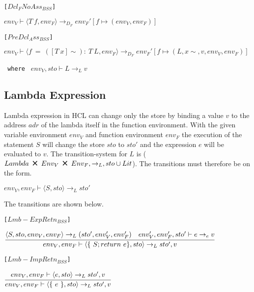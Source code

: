 \texttt{[$Dcl_FNoAss_{BSS}$]}
\begin{center}
	\begin{math}
	{env_V \vdash \langle T\ f,env_F \rangle \rightarrow_{D_F} env_F'[f \mapsto (env_V, env_F)]}
	\end{math}
\end{center}

\texttt{[$PreDcl_Ass_{BSS}$]}
\begin{center}
	\begin{math}
	{env_V \vdash \langle f\ =\ ([T\ x]\sim):\ T\ L,env_F \rangle \rightarrow_{D_F} env_F'[f \mapsto (L, x\sim, v, env_V, env_F)]}
	\end{math}
	
	\texttt{ where } $env_V, sto \vdash L \rightarrow_L v$
\end{center}

\subsection{Lambda Expression}
Lambda expression in HCL can change only the store by binding a value $v$ to the address $adr$ of the lambda itself in the function environment.
With the given variable environment $env_V$ and function environment $env_F$ the execution of the statement $S$ will change the store $sto$ to $sto'$ and the expression $e$ will be evaluated to $v$.
The transition-system for $L$ is ($Lambda\ \Cross\ Env_V\ \Cross\ Env_F, \rightarrow_L, sto \cup Lit$).
The transitions must therefore be on the form.
\begin{center}
	$env_V, env_F \vdash \langle S, sto \rangle \rightarrow_L sto'$
\end{center}

The transitions are shown below.

\texttt{[$Lmb-ExpRetn_{BSS}$]}
\begin{center}
	\begin{math}
		\cfrac
			{\langle S, sto, env_V, env_F \rangle \rightarrow_L (sto', env_V', env_F') \quad env_V', env_F', sto' \vdash e \rightarrow_e v}
			{env_V, env_F \vdash \langle \{\ S;return\ e \}, sto \rangle \rightarrow_L sto', v}
	\end{math}
\end{center}

\texttt{[$Lmb-ImpRetn_{BSS}$]}
\begin{center}
	\begin{math}
	\cfrac
	{env_V, env_F \vdash \langle e, sto \rangle \rightarrow_L sto', v}
	{env_V, env_F \vdash \langle \{\ e\ \}, sto \rangle \rightarrow_L sto', v}
	\end{math}
\end{center}

